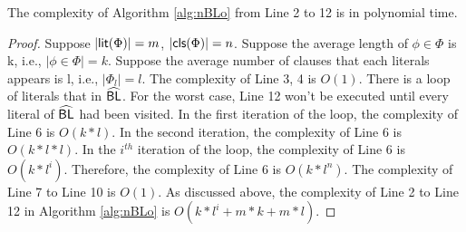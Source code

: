 \begin{theorem}
The complexity of Algorithm \ref{alg:nBLo} from Line 2 to 12 is in polynomial time.
\end{theorem}
\begin{proof}
Suppose $|\textsf{lit}(\Phi)|=m$, $|\textsf{cls}(\Phi)|=n$.
Suppose the average length of $\phi\in\Phi$ is k, i.e., $|\phi\in\Phi|=k$.
Suppose the average number of clauses that each literals appears is l, i.e., $|\Phi_l|=l$.
The complexity of Line 3, 4 is $O(1)$. There is a loop of literals that in ${\sf \widehat{BL}}$. For the worst case, Line 12 won't be executed until every literal of ${\sf \widehat{BL}}$ had been visited. In the first iteration of the loop, the complexity of Line 6 is $O(k*l)$. In the second iteration, the complexity of Line 6 is $O(k*l*l)$. In the $i^{th}$ iteration of the loop, the complexity of Line 6 is $O(k*l^i)$. Therefore, the complexity of Line 6 is $O(k*l^n)$. The complexity of Line 7 to Line 10 is $O(1)$.
As discussed above, the complexity of Line 2 to Line 12 in Algorithm \ref{alg:nBLo} is $O(k*l^i+m*k+m*l)$.
\end{proof}

\medskip





